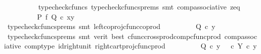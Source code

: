 \begin{isabellebody}
\ \ \ \ \ \ \ \ \isamarkupfalse%
\ {\isacharparenleft}{\kern0pt}typecheck{\isacharunderscore}{\kern0pt}cfuncs{\isacharcomma}{\kern0pt}\ typecheck{\isacharunderscore}{\kern0pt}cfuncs{\isacharunderscore}{\kern0pt}prems{\isacharcomma}{\kern0pt}\ smt\ comp{\isacharunderscore}{\kern0pt}associative{}\ z{\isacharunderscore}{\kern0pt}eq{\isacharparenright}{\kern0pt}\isanewline
\ \ \ \ \ \ \isamarkupfalse%
\ \isamarkupfalse%
\ {\isachardoublequoteopen}{\isacharparenleft}{\kern0pt}P\ {\isasymtimes}\isactrlsub f\ Q{\isacharparenright}{\kern0pt}\ {\isasymcirc}\isactrlsub c\ {\isasymlangle}x{\isacharcomma}{\kern0pt}y{\isasymrangle}\ {\isacharequal}{\kern0pt}\ {\isasymlangle}{\isasymt}{\isacharcomma}{\kern0pt}{\isasymt}{\isasymrangle}{\isachardoublequoteclose}\isanewline
\ \ \ \ \ \ \ \ \isamarkupfalse%
\ {\isacharparenleft}{\kern0pt}typecheck{\isacharunderscore}{\kern0pt}cfuncs{\isacharunderscore}{\kern0pt}prems{\isacharcomma}{\kern0pt}\ smt\ left{\isacharunderscore}{\kern0pt}coproj{\isacharunderscore}{\kern0pt}cfunc{\isacharunderscore}{\kern0pt}coprod{\isacharparenright}{\kern0pt}\isanewline
\ \ \ \ \ \ \isamarkupfalse%
\ \isamarkupfalse%
\ {\isachardoublequoteopen}Q\ {\isasymcirc}\isactrlsub c\ y\ {\isacharequal}{\kern0pt}\ {\isasymt}{\isachardoublequoteclose}\isanewline
\ \ \ \ \ \ \ \ \isamarkupfalse%
\ {\isacharparenleft}{\kern0pt}typecheck{\isacharunderscore}{\kern0pt}cfuncs{\isacharunderscore}{\kern0pt}prems{\isacharcomma}{\kern0pt}\ smt\ {\isacharparenleft}{\kern0pt}verit{\isacharcomma}{\kern0pt}\ best{\isacharparenright}{\kern0pt}\ cfunc{\isacharunderscore}{\kern0pt}cross{\isacharunderscore}{\kern0pt}prod{\isacharunderscore}{\kern0pt}comp{\isacharunderscore}{\kern0pt}cfunc{\isacharunderscore}{\kern0pt}prod\ comp{\isacharunderscore}{\kern0pt}associative{}\ comp{\isacharunderscore}{\kern0pt}type\ id{\isacharunderscore}{\kern0pt}right{\isacharunderscore}{\kern0pt}unit{}\ right{\isacharunderscore}{\kern0pt}cart{\isacharunderscore}{\kern0pt}proj{\isacharunderscore}{\kern0pt}cfunc{\isacharunderscore}{\kern0pt}prod{\isacharparenright}{\kern0pt}\isanewline
\ \ \ \ \ \ \isamarkupfalse%
\ \isamarkupfalse%
\ {\isachardoublequoteopen}Q\ {\isasymcirc}\isactrlsub c\ y\ {\isacharequal}{\kern0pt}\ {\isacharparenleft}{\kern0pt}{\isasymt}\ {\isasymcirc}\isactrlsub c\ {\isasymbeta}\isactrlbsub Y\isactrlesub {\isacharparenright}{\kern0pt}\ {\isasymcirc}\isactrlsub c\ y{\isachardoublequoteclose}\isanewline

\end{isabellebody}
